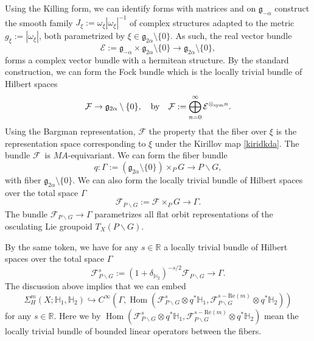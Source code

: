 \documentclass[a4paper,reqno]{amsart}
\numberwithin{equation}{section}
\def\Hom{\operatorname{Hom}}
\def\R{\mathbb{R}}
\theoremstyle{definition}
\theoremstyle{remark}
\begin{document}
Using the Killing form, we can identify forms with matrices and on $\mathfrak{g}_{-\alpha}$ construct the smooth family $J_\xi:=\omega_\xi|\omega_\xi|^{-1}$ of complex structures adapted to the metric $g_\xi:=|\omega_\xi|$, both parametrized by $\xi\in \mathfrak{g}_{2\alpha}\setminus \{0\}$. As such, the real vector bundle
$$\mathcal{E}:=\mathfrak{g}_{-\alpha}\times  \mathfrak{g}_{2\alpha}\setminus \{0\}\to  \mathfrak{g}_{2\alpha}\setminus \{0\},$$
forms a complex vector bundle with a hermitean structure. By the standard construction, we can form the Fock bundle which is the locally trivial bundle of Hilbert spaces 
$$\mathcal{F}\to \mathfrak{g}_{2\alpha}\setminus \{0\},\quad\mbox{by}\quad \mathcal{F}:=\bigoplus_{n=0}^\infty \mathcal{E}^{\otimes_{\rm sym} n}.$$
Using the Bargman representation, $\mathcal{F}$ the property that the fiber over $\xi$ is the representation space corresponding to $\xi$ under the Kirillov map \eqref{kiridkda}. The bundle $\mathcal{F}$ is $MA$-equivariant. We can form the fiber bundle 
$$q:\Gamma:=(\mathfrak{g}_{2\alpha}\setminus \{0\})\times_{P}G\to P\backslash G,$$ 
with fiber $\mathfrak{g}_{2\alpha}\setminus \{0\}$. We can also form the locally trivial bundle of Hilbert spaces over the total space $\Gamma$
$$\mathcal{F}_{P\backslash G}:=\mathcal{F}\times_P G\to \Gamma.$$
The bundle $\mathcal{F}_{P\backslash G}\to \Gamma$ parametrizes all flat orbit representations of the osculating Lie groupoid $T_X(P\backslash G)$.

By the same token, we have for any $s\in \R$ a locally trivial bundle of Hilbert spaces over the total space $\Gamma$
$$\mathcal{F}^s_{P\backslash G}:=(1+\delta_{\mathbb{H}_2})^{-s/2}\mathcal{F}_{P\backslash G}\to \Gamma.$$
The discussion above implies that we can embed 
$$\Sigma_H^m(X;\mathbb{H}_1,\mathbb{H}_2)\hookrightarrow C^\infty(\Gamma,\Hom(\mathcal{F}^s_{P\backslash G}\otimes q^*\mathbb{H}_1,\mathcal{F}^{s-\mathrm{Re}(m)}_{P\backslash G}\otimes q^*\mathbb{H}_2))$$
for any $s\in \R$. Here we by $\Hom(\mathcal{F}^s_{P\backslash G}\otimes q^*\mathbb{H}_1,\mathcal{F}^{s-\mathrm{Re}(m)}_{P\backslash G}\otimes q^*\mathbb{H}_2)$ mean the locally trivial bundle of bounded linear operators between the fibers. 
\end{document}
